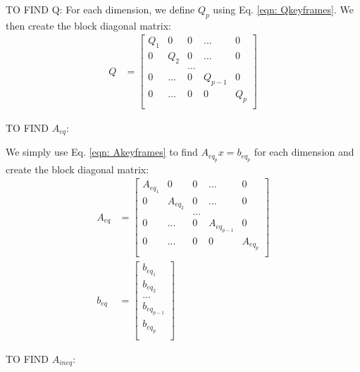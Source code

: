 \documentclass[11pt]{article}
\begin{document}
\mbox{} \newline
\mbox{} \newline
TO FIND Q: \newline
For each dimension, we define $Q_p$ using Eq. \ref{eqn: Qkeyframes}. We then create the block diagonal matrix:
\begin{align}
\label{eqn: Qdim} Q &= 
\begin{bmatrix}
  Q_1 & 0 & 0 & ... & 0 \\
  0 & Q_2 & 0 & ... & 0 \\
  & & ... & &  \\
  0 & ... & 0 & Q_{p-1} & 0 \\
  0 & ... & 0 & 0 & Q_p \\ 
 \end{bmatrix}
\end{align}




\mbox{} \newline
\mbox{} \newline
TO FIND $A_{eq}$: \newline

We simply use Eq. \ref{eqn: Akeyframes} to find $A_{eq_p} x = b_{eq_p} $ for each dimension and create the block diagonal matrix:
\begin{align}
\label{eqn: Aeqdim} A_{eq} &= 
\begin{bmatrix}
  A_{eq_1} & 0 & 0 & ... & 0 \\
  0 & A_{eq_2} & 0 & ... & 0 \\
  & & ... & &  \\
  0 & ... & 0 & A_{eq_{p-1}} & 0 \\
  0 & ... & 0 & 0 & A_{eq_p} \\ 
 \end{bmatrix} \\
 \nonumber b_{eq} &= 
 \begin{bmatrix}
  b_{eq_1}  \\
  b_{eq_2}  \\
  ... \\
    b_{eq_{p-1}}  \\
      b_{eq_p}  \\
 \end{bmatrix} 
\end{align}





\mbox{} \newline
\mbox{} \newline
TO FIND $A_{ineq}$: \newline
\end{document}
